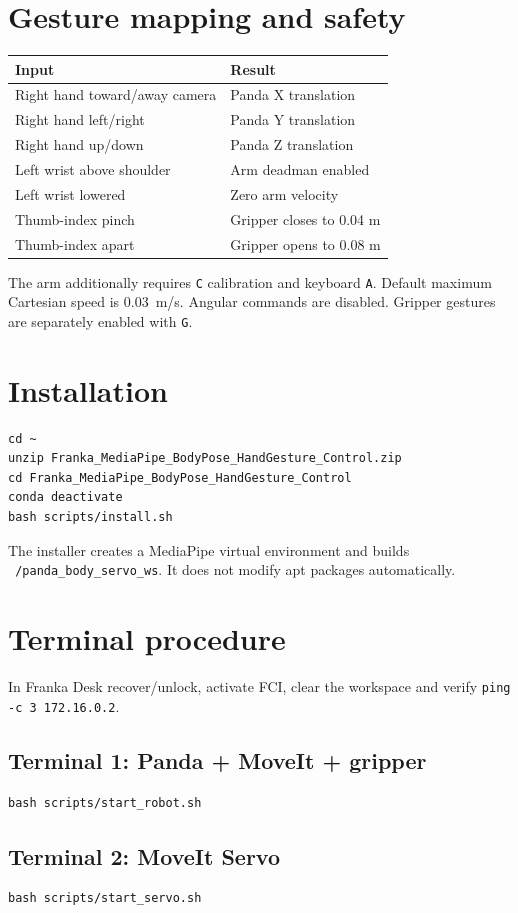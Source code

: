 \documentclass[11pt,a4paper]{article}
\begin{document}
\section{Gesture mapping and safety}
\begin{tabularx}{\textwidth}{@{}lX@{}}\toprule Input & Result\\\midrule Right hand toward/away camera & Panda X translation\\Right hand left/right & Panda Y translation\\Right hand up/down & Panda Z translation\\Left wrist above shoulder & Arm deadman enabled\\Left wrist lowered & Zero arm velocity\\Thumb-index pinch & Gripper closes to 0.04 m\\Thumb-index apart & Gripper opens to 0.08 m\\\bottomrule\end{tabularx}
The arm additionally requires \texttt{C} calibration and keyboard \texttt{A}. Default maximum Cartesian speed is 0.03~m/s. Angular commands are disabled. Gripper gestures are separately enabled with \texttt{G}.
\section{Installation}
\begin{lstlisting}
cd ~
unzip Franka_MediaPipe_BodyPose_HandGesture_Control.zip
cd Franka_MediaPipe_BodyPose_HandGesture_Control
conda deactivate
bash scripts/install.sh
\end{lstlisting}
The installer creates a MediaPipe virtual environment and builds \texttt{~/panda\_body\_servo\_ws}. It does not modify apt packages automatically.
\section{Terminal procedure}
In Franka Desk recover/unlock, activate FCI, clear the workspace and verify \texttt{ping -c 3 172.16.0.2}.
\subsection*{Terminal 1: Panda + MoveIt + gripper}\begin{lstlisting}
bash scripts/start_robot.sh
\end{lstlisting}
\subsection*{Terminal 2: MoveIt Servo}\begin{lstlisting}
bash scripts/start_servo.sh
\end{lstlisting}
\end{document}
